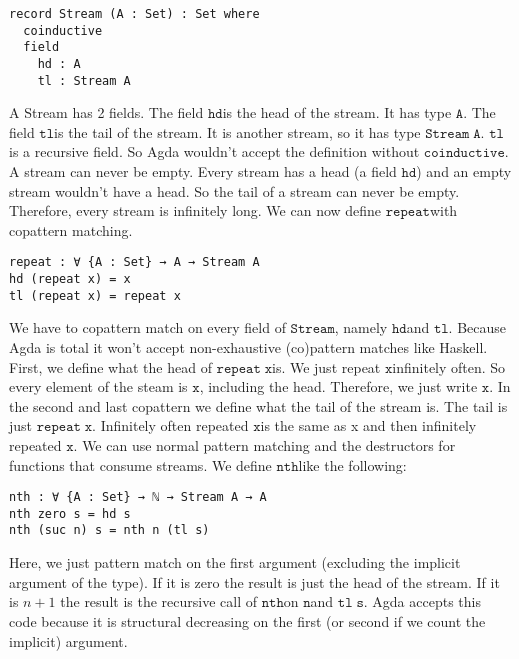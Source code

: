 \documentclass[a4paper,cleardoubleempty,BCOR1cm]{scrbook}
\begin{document}
\begin{verbatim}
record Stream (A : Set) : Set where
  coinductive
  field
    hd : A
    tl : Stream A
\end{verbatim}

A Stream has 2 fields. The field $\mathtt{hd}$\;is the head of the stream. It has type
$\mathtt{A}$. The field $\mathtt{tl}$\;is the tail of the stream. It is another stream, so it
has type $\mathtt{Stream\;A}$. $\mathtt{tl}$\;is a recursive field. So Agda wouldn't accept the
definition without $\mathtt{coinductive}$. A stream can never be empty. Every stream
has a head (a field $\mathtt{hd}$) and an empty stream wouldn't have a head. So the
tail of a stream can never be empty. Therefore, every stream is infinitely
long. We can now define $\mathtt{repeat}$\;with copattern matching.

\begin{verbatim}
repeat : ∀ {A : Set} → A → Stream A
hd (repeat x) = x
tl (repeat x) = repeat x
\end{verbatim}

We have to copattern match on every field of $\mathtt{Stream}$, namely $\mathtt{hd}$\;and $\mathtt{tl}$.
Because Agda is total it won't accept non-exhaustive (co)pattern matches
like Haskell.  First, we define what the head of $\mathtt{repeat\;x}$\;is.  We just
repeat $\mathtt{x}$\;infinitely often.  So every element of the steam is $\mathtt{x}$, including
the head.  Therefore, we just write $\mathtt{x}$.  In the second and last copattern we
define what the tail of the stream is.  The tail is just $\mathtt{repeat\;x}$.
Infinitely often repeated $\mathtt{x}$\;is the same as x and then infinitely repeated
$\mathtt{x}$.  We can use normal pattern matching and the destructors for functions
that consume streams.  We define $\mathtt{nth}$\;like the following:

\begin{verbatim}
nth : ∀ {A : Set} → ℕ → Stream A → A
nth zero s = hd s
nth (suc n) s = nth n (tl s)
\end{verbatim}

Here, we just pattern match on the first argument (excluding the implicit
argument of the type).  If it is zero the result is just the head of the
stream.  If it is \(n+1\) the result is the recursive call of $\mathtt{nth}$\;on $\mathtt{n}$\;and
$\mathtt{tl\;s}$.  Agda accepts this code because it is structural decreasing on the
first (or second if we count the implicit) argument.
\end{document}
